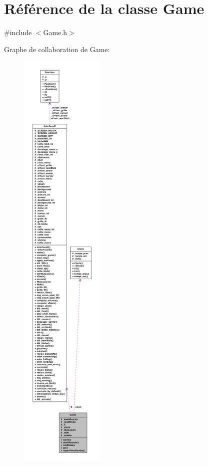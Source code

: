 \hypertarget{a00008}{
\section{Référence de la classe Game}
\label{a00008}
}


{\ttfamily \#include $<$Game.h$>$}



Graphe de collaboration de Game:
\nopagebreak
\begin{figure}[H]
\begin{center}
\leavevmode
\includegraphics[height=600pt]{a00083}
\end{center}
\end{figure}
